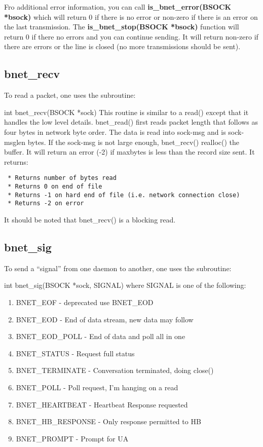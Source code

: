 Fro additional error information, you can call {\bf is\_bnet\_error(BSOCK
*bsock)} which will return 0 if there is no error or non-zero if there is an
error on the last transmission. The {\bf is\_bnet\_stop(BSOCK *bsock)}
function will return 0 if there no errors and you can continue sending. It
will return non-zero if there are errors or the line is closed (no more
transmissions should be sent). 

\subsection*{bnet\_recv}

To read a packet, one uses the subroutine: 

int bnet\_recv(BSOCK *sock) This routine is similar to a read() except that it
handles the low level details. bnet\_read() first reads packet length that
follows as four bytes in network byte order. The data is read into
sock-\gt{}msg and is sock-\gt{}msglen bytes. If the sock-\gt{}msg is not large
enough, bnet\_recv() realloc() the buffer. It will return an error (-2) if
maxbytes is less than the record size sent. It returns: 

\footnotesize
\begin{verbatim}
 * Returns number of bytes read
 * Returns 0 on end of file
 * Returns -1 on hard end of file (i.e. network connection close)
 * Returns -2 on error
\end{verbatim}
\normalsize

It should be noted that bnet\_recv() is a blocking read. 

\subsection*{bnet\_sig}

To send a ``signal'' from one daemon to another, one uses the subroutine: 

int bnet\_sig(BSOCK *sock, SIGNAL) where SIGNAL is one of the following: 

\begin{enumerate}
\item BNET\_EOF - deprecated use BNET\_EOD  
\item BNET\_EOD - End of data stream, new data may follow  
\item BNET\_EOD\_POLL - End of data and poll all in one 
\item BNET\_STATUS - Request full status  
\item BNET\_TERMINATE - Conversation terminated, doing close() 
\item BNET\_POLL - Poll request, I'm hanging on a read 
\item BNET\_HEARTBEAT - Heartbeat Response requested 
\item BNET\_HB\_RESPONSE - Only response permitted to HB 
\item BNET\_PROMPT - Prompt for UA 
   \end{enumerate}

